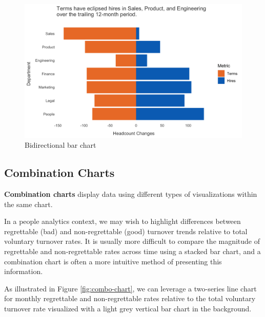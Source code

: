 \documentclass[
]{book}
\begin{document}
\begin{figure}

{\centering \includegraphics[width=1\linewidth]{graphics/bidirectional_bar_chart} 

}

\caption{Bidirectional bar chart}\label{fig:bbar-chart}
\end{figure}

\hypertarget{combination-charts}{%
\subsection{Combination Charts}\label{combination-charts}}

\textbf{Combination charts} display data using different types of visualizations within the same chart.

In a people analytics context, we may wish to highlight differences between regrettable (bad) and non-regrettable (good) turnover trends relative to total voluntary turnover rates. It is usually more difficult to compare the magnitude of regrettable and non-regrettable rates across time using a stacked bar chart, and a combination chart is often a more intuitive method of presenting this information.

As illustrated in Figure \ref{fig:combo-chart}, we can leverage a two-series line chart for monthly regrettable and non-regrettable rates relative to the total voluntary turnover rate visualized with a light grey vertical bar chart in the background.
\end{document}
